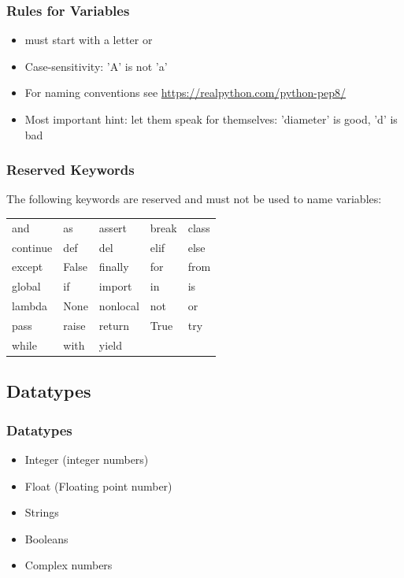 \documentclass[english]{beamer}
\begin{document}
\begin{frame}
\frametitle{Rules for Variables}

\begin{itemize}
\item must start with a letter or \textunderscore
\item Case-sensitivity: 'A' is not 'a'
\item For naming conventions see \url{https://realpython.com/python-pep8/}
\item Most important hint: let them speak for themselves: 'diameter' is good, 'd' is bad 
\end{itemize}
\end{frame}


\begin{frame}
\frametitle{Reserved Keywords}

The following  keywords are reserved and must not be used to name variables:

\begin{center}
\begin{tabular}{p{}p{}p{}p{}p{}}
and	&	as	&	assert	&	break	&	class	\\
continue	&	def	&	del	&	elif	&	else	\\
except	&	False	&	finally	&	for	&	from	\\
global	&	if	&	import	&	in	&	is	\\
lambda	&	None	&	nonlocal	&	not	&	or	\\
pass	&	raise	&	return	&	True	&	try	\\
while	&	with	&	yield	&		&		\\
\end{tabular}
\end{center}
\end{frame}



\subsection{Datatypes}

\begin{frame}
\frametitle{Datatypes}


\begin{itemize}
\item Integer (integer numbers)
\item Float (Floating point number)
\item Strings
\item Booleans
\item Complex numbers
\end{itemize}
\end{frame}
\end{document}
